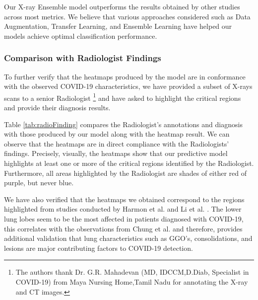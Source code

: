 Our X-ray Ensemble model outperforms the results obtained by other studies across most metrics. We believe that various approaches considered such as Data Augmentation, Transfer Learning, and Ensemble Learning have helped our models achieve optimal classification performance.
\vspace{-1em}

\subsubsection{Comparison with Radiologist Findings} \label{rfxray}

To further verify that the heatmaps produced by the model are in conformance with the observed COVID-19 characteristics, we have provided a subset of X-rays scans to a senior Radiologist \footnote{The authors thank Dr. G.R. Mahadevan (MD, IDCCM,D.Diab, Specialist in COVID-19) from Maya Nursing Home,Tamil Nadu for annotating the X-ray and CT images.} and have asked to highlight the critical regions and provide their diagnosis results. 

Table \ref{tab:radioFinding} compares the Radiologist's annotations and diagnosis with those produced by our model along with the heatmap result.
We can observe that the heatmaps are in direct compliance with the Radiologists’ findings. Precisely, visually, the heatmaps show that our predictive model highlights at least one or more of the critical regions identified by the Radiologist. Furthermore, all areas highlighted by the Radiologist are shades of either red of purple, but never blue.

We have also verified that the heatmaps we obtained correspond to the regions highlighted from studies conducted by Harmon et al. \cite{HSX+2020} and Li et al. \cite{LLL+2020}. The lower lung lobes seem to be the most affected in patients diagnosed with COVID-19, this correlates with the observations from Chung et al. \cite{CMA+2020} and therefore, provides additional validation that lung characteristics such as GGO’s, consolidations, and lesions are major contributing factors to COVID-19 detection.


